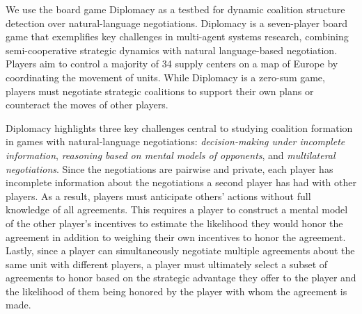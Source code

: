 

We use the board game Diplomacy \citep{calhamer1974invention} as a testbed for dynamic coalition structure detection over natural-language negotiations. Diplomacy is a seven-player board game that exemplifies key challenges in multi-agent systems research, combining semi-cooperative strategic dynamics with natural language-based negotiation. Players aim to control a majority of 34 supply centers on a map of Europe by coordinating the movement of units. While Diplomacy is a zero-sum game, players must negotiate strategic coalitions to support their own plans or counteract the moves of other players.




Diplomacy highlights three key challenges central to studying coalition formation in games with natural-language negotiations: \emph{decision-making under incomplete information}, \emph{reasoning based on mental models of opponents}, and \emph{multilateral negotiations}. 
Since the negotiations are pairwise and private, each player has incomplete information about the negotiations a second player has had with other players. 
As a result, players must anticipate others' actions without full knowledge of all agreements. This requires a player to construct a mental model of the other player's incentives to estimate the likelihood they would honor the agreement in addition to weighing their own incentives to honor the agreement. Lastly, since a player can simultaneously negotiate multiple agreements about the same unit with different players, a player must ultimately select a subset of agreements to honor based on the strategic advantage they offer to the player and the likelihood of them being honored by the player with whom the agreement is made.

